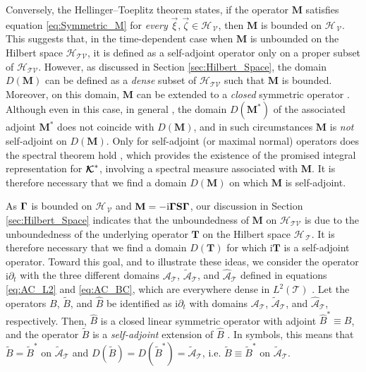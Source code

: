 \documentclass[11pt]{amsart}
\newcommand{\I}{\mathrm{i}}
\newcommand{\Mb}{\mathbf{M}}
\newcommand{\Tb}{\mathbf{T}}
\newcommand{\Sb}{\mathbf{S}}
\newcommand\Kbc{\mbox{\boldmath${\mathcal{K}}$}}
\newcommand{\Tc}{\mathcal{T}}
\newcommand{\Vc}{\mathcal{V}}
\newcommand{\Hs}{\mathscr{H}}
\newcommand{\As}{\mathscr{A}}
\newcommand\bGamma{\mbox{\boldmath${\Gamma}$}}
\begin{document}
Conversely, the Hellinger--Toeplitz theorem \cite{Reed-1980} states,
if the operator $\Mb$ satisfies equation \eqref{eq:Symmetric_M} for
\emph{every} $\vec{\xi},\vec{\zeta}\in\Hs_{\,\Vc}$, then $\Mb$ is
bounded on $\Hs_{\,\Vc}$. This suggests that, in the time-dependent
case when $\Mb$ is unbounded on the Hilbert space $\Hs_{\Tc\Vc}$, it
is defined as a self-adjoint operator only on a proper subset of
$\Hs_{\Tc\Vc}$. However, as discussed in 
Section \ref{sec:Hilbert_Space}, the domain $D(\Mb)$ can be defined as
a \emph{dense} subset of $\Hs_{\Tc\Vc}$ such that $\Mb$ is
bounded. Moreover, on this domain, $\Mb$ can be extended to a 
\emph{closed} symmetric operator \cite{Reed-1980,Stone:64}. Although
even in this case, in general \cite{Reed-1980}, the domain $D(\Mb^*)$
of the associated adjoint $\Mb^*$ does not coincide with $D(\Mb)$, and
in such circumstances $\Mb$ is \emph{not} self-adjoint on $D(\Mb)$. Only for
self-adjoint (or maximal normal) operators does the spectral theorem hold
\cite{Reed-1980}, which provides the existence of the promised
integral representation for $\Kbc^*$, involving a spectral measure
associated with $\Mb$. It is therefore necessary that we find a
domain $D(\Mb)$ on which $\Mb$ is self-adjoint.




As $\bGamma$ is bounded on $\Hs_{\,\Vc}$ and
$\Mb=-\I\bGamma\Sb\bGamma$, our discussion in Section
\ref{sec:Hilbert_Space} indicates that the unboundedness of $\Mb$ on
$\Hs_{\Tc\Vc}$ is due to the unboundedness of the underlying operator
$\Tb$ on the Hilbert space $\Hs_{\,\Tc}$. It is therefore necessary
that we find a domain $D(\Tb)$ for which $\I\Tb$ is a self-adjoint
operator. Toward this goal, and to illustrate these ideas, we consider
the operator $\I\partial_t$ with the three different domains $\As_{\Tc}$,
$\tilde{\As}_{\Tc}$, and $\hat{\As}_{\Tc}$ defined in equations
\eqref{eq:AC_L2} and \eqref{eq:AC_BC}, which are everywhere dense in
$L^2(\Tc)$ \cite{Stone:64}. Let the operators $B$, $\tilde{B}$, and
$\hat{B}$ be identified as $\I\partial_t$ with domains $\As_{\Tc}$,
$\tilde{\As}_{\Tc}$, and $\hat{\As}_{\Tc}$, respectively. Then,
$\hat{B}$ is a closed linear symmetric operator with adjoint
$\hat{B}^*\equiv B$, and the operator $\tilde{B}$ is a \emph{self-adjoint}
extension of $\hat{B}$ \cite{Stone:64}. In symbols, this means that 
$\tilde{B}=\tilde{B}^*$ on $\tilde{\As}_{\Tc}$ and
$D(\tilde{B})=D(\tilde{B}^*)=\tilde{\As}_{\Tc}$,
i.e. $\tilde{B}\equiv\tilde{B}^*$ on $\tilde{\As}_{\Tc}$.     
\end{document}
